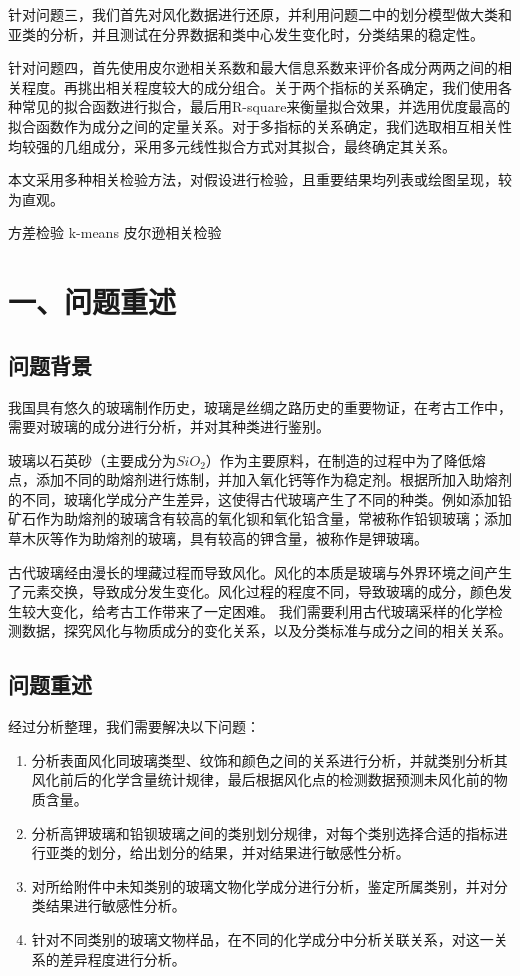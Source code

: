 \documentclass{my_paper}
\begin{document}
针对问题三，我们首先对风化数据进行还原，并利用问题二中的划分模型做大类和亚类的分析，并且测试在分界数据和类中心发生变化时，分类结果的稳定性。

针对问题四，首先使用皮尔逊相关系数和最大信息系数来评价各成分两两之间的相关程度。再挑出相关程度较大的成分组合。关于两个指标的关系确定，我们使用各种常见的拟合函数进行拟合，最后用R-square来衡量拟合效果，并选用优度最高的拟合函数作为成分之间的定量关系。对于多指标的关系确定，我们选取相互相关性均较强的几组成分，采用多元线性拟合方式对其拟合，最终确定其关系。

本文采用多种相关检验方法，对假设进行检验，且重要结果均列表或绘图呈现，较为直观。

\begin{guanjianci}
 方差检验 \quad k-means \quad 皮尔逊相关检验
\end{guanjianci}

\newpage
\section{一、问题重述}

\subsection{问题背景}

我国具有悠久的玻璃制作历史，玻璃是丝绸之路历史的重要物证，在考古工作中，需要对玻璃的成分进行分析，并对其种类进行鉴别。

玻璃以石英砂（主要成分为$SiO_2$）作为主要原料，在制造的过程中为了降低熔点，添加不同的助熔剂进行炼制，并加入氧化钙等作为稳定剂。根据所加入助熔剂的不同，玻璃化学成分产生差异，这使得古代玻璃产生了不同的种类。例如添加铅矿石作为助熔剂的玻璃含有较高的氧化钡和氧化铅含量，常被称作铅钡玻璃；添加草木灰等作为助熔剂的玻璃，具有较高的钾含量，被称作是钾玻璃。

古代玻璃经由漫长的埋藏过程而导致风化。风化的本质是玻璃与外界环境之间产生了元素交换，导致成分发生变化。风化过程的程度不同，导致玻璃的成分，颜色发生较大变化，给考古工作带来了一定困难。
我们需要利用古代玻璃采样的化学检测数据，探究风化与物质成分的变化关系，以及分类标准与成分之间的相关关系。

\subsection{问题重述}
经过分析整理，我们需要解决以下问题：
\begin{enumerate}
    \item 分析表面风化同玻璃类型、纹饰和颜色之间的关系进行分析，并就类别分析其风化前后的化学含量统计规律，最后根据风化点的检测数据预测未风化前的物质含量。
    \item 分析高钾玻璃和铅钡玻璃之间的类别划分规律，对每个类别选择合适的指标进行亚类的划分，给出划分的结果，并对结果进行敏感性分析。
    \item 对所给附件中未知类别的玻璃文物化学成分进行分析，鉴定所属类别，并对分类结果进行敏感性分析。
    \item 针对不同类别的玻璃文物样品，在不同的化学成分中分析关联关系，对这一关系的差异程度进行分析。
\end{enumerate}
\end{document}

